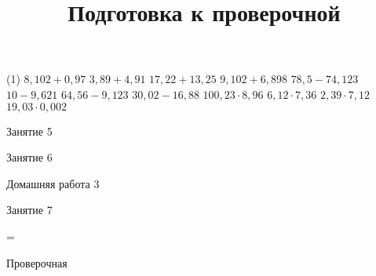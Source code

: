 \begin{homework}[number=2]
	\begin{listofex}
		\item 
		\begin{tasks}(1)
			\task \( 8,102+0,97 \)
			\task \( 3,89+4,91 \)
			\task \( 17,22+13,25 \)
			\task \( 9,102+6,898 \)
			\task \( 78,5-74,123 \)
			\task \( 10-9,621 \)
			\task \( 64,56-9,123 \)
			\task \( 30,02-16,88 \)
			\task \( 100,23\cdot8,96 \)
			\task \( 6,12\cdot7,36 \)
			\task \( 2,39\cdot7,12 \)
			\task \( 19,03\cdot0,002 \)
		\end{tasks}
	\end{listofex}
\end{homework}

\begin{class}[number=5]
	\begin{listofex}
		\item Занятие 5
	\end{listofex}
\end{class}

\begin{class}[number=6]
	\begin{listofex}
		\item Занятие 6
	\end{listofex}
\end{class}

\begin{homework}[number=3]
	\begin{listofex}
		\item Домашняя работа 3
	\end{listofex}
\end{homework}

\begin{class}[number=7]
	\title{Подготовка к проверочной}
	\begin{listofex}
		\item Занятие 7
	\end{listofex}
\end{class}

=%
\begin{exam}
	\begin{listofex}
		\item Проверочная
	\end{listofex}
\end{exam}
